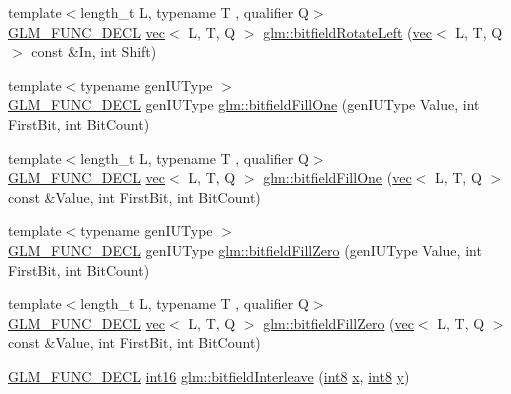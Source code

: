 \begin{DoxyCompactItemize}
\item 
{\footnotesize template$<$length\+\_\+t L, typename T , qualifier Q$>$ }\\\mbox{\hyperlink{setup_8hpp_ab2d052de21a70539923e9bcbf6e83a51}{G\+L\+M\+\_\+\+F\+U\+N\+C\+\_\+\+D\+E\+CL}} \mbox{\hyperlink{structglm_1_1vec}{vec}}$<$ L, T, Q $>$ \mbox{\hyperlink{group__gtc__bitfield_gae186317091b1a39214ebf79008d44a1e}{glm\+::bitfield\+Rotate\+Left}} (\mbox{\hyperlink{structglm_1_1vec}{vec}}$<$ L, T, Q $>$ const \&In, int Shift)
\item 
{\footnotesize template$<$typename gen\+I\+U\+Type $>$ }\\\mbox{\hyperlink{setup_8hpp_ab2d052de21a70539923e9bcbf6e83a51}{G\+L\+M\+\_\+\+F\+U\+N\+C\+\_\+\+D\+E\+CL}} gen\+I\+U\+Type \mbox{\hyperlink{group__gtc__bitfield_ga46f9295abe3b5c7658f5b13c7f819f0a}{glm\+::bitfield\+Fill\+One}} (gen\+I\+U\+Type Value, int First\+Bit, int Bit\+Count)
\item 
{\footnotesize template$<$length\+\_\+t L, typename T , qualifier Q$>$ }\\\mbox{\hyperlink{setup_8hpp_ab2d052de21a70539923e9bcbf6e83a51}{G\+L\+M\+\_\+\+F\+U\+N\+C\+\_\+\+D\+E\+CL}} \mbox{\hyperlink{structglm_1_1vec}{vec}}$<$ L, T, Q $>$ \mbox{\hyperlink{group__gtc__bitfield_ga3e96dd1f0a4bc892f063251ed118c0c1}{glm\+::bitfield\+Fill\+One}} (\mbox{\hyperlink{structglm_1_1vec}{vec}}$<$ L, T, Q $>$ const \&Value, int First\+Bit, int Bit\+Count)
\item 
{\footnotesize template$<$typename gen\+I\+U\+Type $>$ }\\\mbox{\hyperlink{setup_8hpp_ab2d052de21a70539923e9bcbf6e83a51}{G\+L\+M\+\_\+\+F\+U\+N\+C\+\_\+\+D\+E\+CL}} gen\+I\+U\+Type \mbox{\hyperlink{group__gtc__bitfield_ga697b86998b7d74ee0a69d8e9f8819fee}{glm\+::bitfield\+Fill\+Zero}} (gen\+I\+U\+Type Value, int First\+Bit, int Bit\+Count)
\item 
{\footnotesize template$<$length\+\_\+t L, typename T , qualifier Q$>$ }\\\mbox{\hyperlink{setup_8hpp_ab2d052de21a70539923e9bcbf6e83a51}{G\+L\+M\+\_\+\+F\+U\+N\+C\+\_\+\+D\+E\+CL}} \mbox{\hyperlink{structglm_1_1vec}{vec}}$<$ L, T, Q $>$ \mbox{\hyperlink{group__gtc__bitfield_ga0d16c9acef4be79ea9b47c082a0cf7c2}{glm\+::bitfield\+Fill\+Zero}} (\mbox{\hyperlink{structglm_1_1vec}{vec}}$<$ L, T, Q $>$ const \&Value, int First\+Bit, int Bit\+Count)
\item 
\mbox{\hyperlink{setup_8hpp_ab2d052de21a70539923e9bcbf6e83a51}{G\+L\+M\+\_\+\+F\+U\+N\+C\+\_\+\+D\+E\+CL}} \mbox{\hyperlink{group__gtc__type__precision_ga2945a61d12771f8954994fcddf02b021}{int16}} \mbox{\hyperlink{group__gtc__bitfield_ga479134317bc95d99f2b2e235d3db287b}{glm\+::bitfield\+Interleave}} (\mbox{\hyperlink{group__gtc__type__precision_ga96254f9c1c4506fc8eb5cf3301ce8565}{int8}} \mbox{\hyperlink{_s_d_l__opengl_8h_ad0e63d0edcdbd3d79554076bf309fd47}{x}}, \mbox{\hyperlink{group__gtc__type__precision_ga96254f9c1c4506fc8eb5cf3301ce8565}{int8}} \mbox{\hyperlink{_s_d_l__opengl_8h_a1675d9d7bb68e1657ff028643b4037e3}{y}})

\end{DoxyCompactItemize}
